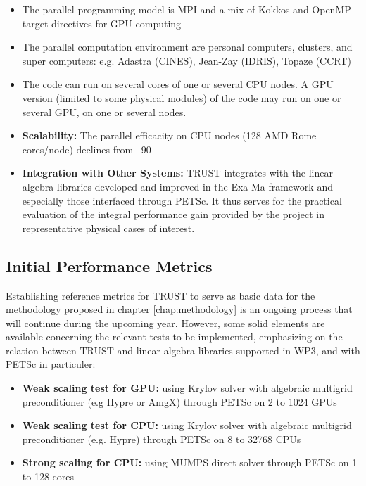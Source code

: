 \begin{itemize}
    \item The parallel programming model is MPI and a mix of Kokkos and OpenMP-target directives for GPU computing  
    \item The parallel computation environment are personal computers, clusters, and super computers: e.g. Adastra (CINES), Jean-Zay (IDRIS), Topaze (CCRT)
    \item The code can run on several cores of one or several CPU nodes. A GPU version (limited to some physical modules) of the code may run on one or several GPU, on one or several nodes.
    \item \textbf{Scalability:} The parallel efficacity on CPU nodes (128 AMD Rome cores/node) declines from ~90%
    \item \textbf{Integration with Other Systems:} TRUST integrates with the linear algebra libraries developed and improved in the Exa-Ma framework and especially those interfaced through PETSc. It thus serves for the practical evaluation of the integral performance gain provided by the project in representative physical cases of interest.
\end{itemize}


\subsection{Initial Performance Metrics}
\label{sec:WP3:TRUST Platform:metrics}

Establishing reference metrics for TRUST to serve as basic data for the methodology proposed in chapter \ref{chap:methodology} is an ongoing process that will continue during the upcoming year. However, some solid elements are available concerning the relevant tests to be implemented, emphasizing on the relation between TRUST and linear algebra libraries supported in WP3, and with PETSc in particuler:

\begin{itemize}
    \item \textbf{Weak scaling test for GPU: } using Krylov solver with algebraic multigrid preconditioner (e.g Hypre or AmgX) through PETSc on 2 to 1024 GPUs
    \item\textbf{Weak scaling test for CPU: } using Krylov solver with algebraic multigrid preconditioner (e.g. Hypre) through PETSc on 8 to 32768 CPUs
    \item \textbf{Strong scaling for CPU: } using MUMPS direct solver through PETSc on 1 to 128 cores
\end{itemize}

